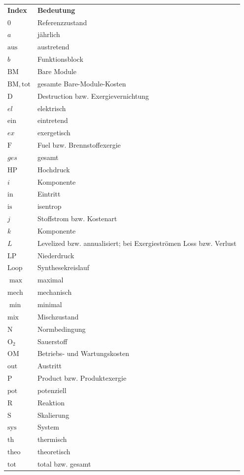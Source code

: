 \begin{longtable}{p{3cm}p{11cm}}
\textbf{Index} & \textbf{Bedeutung} \\
\addlinespace[0.5em]
$0$ & Referenzzustand \\
$a$ & jährlich \\
$\mathrm{aus}$ & austretend \\
$b$ & Funktionsblock \\
$\mathrm{BM}$ & Bare Module \\
$\mathrm{BM,tot}$ & gesamte Bare-Module-Kosten \\
$\mathrm{D}$ & Destruction bzw. Exergievernichtung \\
$el$ & elektrisch \\
$\mathrm{ein}$ & eintretend \\
$ex$ & exergetisch \\
$\mathrm{F}$ & Fuel bzw. Brennstoffexergie \\
$ges$ & gesamt \\
$\mathrm{HP}$ & Hochdruck \\
$i$ & Komponente \\
$\mathrm{in}$ & Eintritt \\
$\mathrm{is}$ & isentrop \\
$j$ & Stoffstrom bzw. Kostenart \\
$k$ & Komponente \\
$L$ & Levelized bzw. annualisiert; bei Exergieströmen Loss bzw. Verlust \\
$\mathrm{LP}$ & Niederdruck \\
$\mathrm{Loop}$ & Synthesekreislauf \\
$\max$ & maximal \\
$\mathrm{mech}$ & mechanisch \\
$\min$ & minimal \\
$\mathrm{mix}$ & Mischzustand \\
$\mathrm{N}$ & Normbedingung \\
$\mathrm{O_2}$ & Sauerstoff \\
$\mathrm{OM}$ & Betriebs- und Wartungskosten \\
$\mathrm{out}$ & Austritt \\
$\mathrm{P}$ & Product bzw. Produktexergie \\
$\mathrm{pot}$ & potenziell \\
$\mathrm{R}$ & Reaktion \\
$\mathrm{S}$ & Skalierung \\
$\mathrm{sys}$ & System \\
$\mathrm{th}$ & thermisch \\
$\mathrm{theo}$ & theoretisch \\
$\mathrm{tot}$ & total bzw. gesamt \\
\end{longtable}

